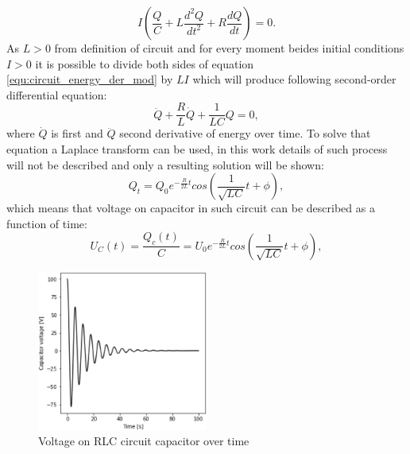\begin{equation}
	\label{equ:circuit_energy_der_mod}
	I(\frac{Q}{C} + L\frac{d^{2}Q}{dt^{2}} + R\frac{dQ}{dt}) = 0.
\end{equation}
As $L>0$ from definition of circuit and for every moment beides initial conditions $I>0$ it is
possible to divide both sides of equation \ref{equ:circuit_energy_der_mod} by $LI$ which will
produce following second-order differential equation:
\begin{equation}
	\label{equ:circuit_energy_der_div}
	\ddot{Q} + \frac{R}{L}\dot{Q} + \frac{1}{LC}Q=0,
\end{equation}
where $\dot{Q}$ is first and $\ddot{Q}$ second derivative of energy over time.
To solve that equation a Laplace transform can be used, in this work details of such process
will not be described and only a resulting solution will be shown:
\begin{equation}
	\label{equ:circuit_energy_solved}
	Q_{t}=Q_{0}e^{-\frac{R}{2L}t}cos(\frac{1}{\sqrt{LC}}t+\phi),
\end{equation}
which means that voltage on capacitor in such circuit can be described as a function of time:
\begin{equation}
	\label{qeu:cap_voltage}
	U_{C}(t) = \frac{Q_c(t)}{C} = U_{0}e^{-\frac{R}{2L}t}cos(\frac{1}{\sqrt{LC}}t+\phi), 
\end{equation}
\begin{figure}[htb] 
	\label{fig:rlc_voltage}
	\centering
	\includegraphics[width=0.5\textwidth]{figures/rlc_capacitor}
	\caption{Voltage on RLC circuit capacitor over time}
\end{figure}

